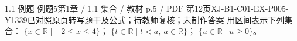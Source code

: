 \par\noindent\begin{minipage}{\linewidth}
\begin{bankitem}{1.1 例题 例题5}{第1章 / 1.1 集合 / 教材 p.5 / PDF 第12页}{XJ-B1-C01-EX-P005-Y1339}{已对照原页转写题干及公式；待教师复核；未制作答案}
用区间表示下列集合：
$\{x\in\mathbb R\mid -2\le x\le4\}$；
$\{t\in\mathbb R\mid t<a,\ a\in\mathbb R\}$；
$\{u\in\mathbb R\mid u\ge0\}$。
\end{bankitem}
\end{minipage}\par\medskip
